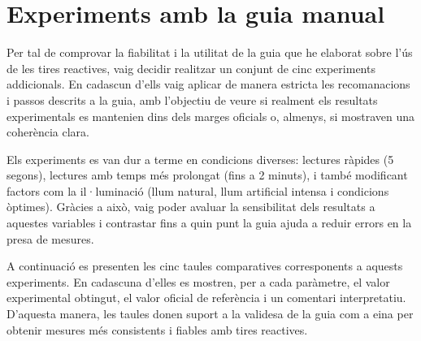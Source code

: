 
\chapter{Experiments amb la guia manual} \label{a:guia}

Per tal de comprovar la fiabilitat i la utilitat de la guia que he elaborat sobre l’ús de les tires reactives, vaig decidir realitzar un conjunt de cinc experiments addicionals. En cadascun d’ells vaig aplicar de manera estricta les recomanacions i passos descrits a la guia, amb l’objectiu de veure si realment els resultats experimentals es mantenien dins dels marges oficials o, almenys, si mostraven una coherència clara.

Els experiments es van dur a terme en condicions diverses: lectures ràpides (5 segons), lectures amb temps més prolongat (fins a 2 minuts), i també modificant factors com la il·luminació (llum natural, llum artificial intensa i condicions òptimes). Gràcies a això, vaig poder avaluar la sensibilitat dels resultats a aquestes variables i contrastar fins a quin punt la guia ajuda a reduir errors en la presa de mesures.

A continuació es presenten les cinc taules comparatives corresponents a aquests experiments. En cadascuna d’elles es mostren, per a cada paràmetre, el valor experimental obtingut, el valor oficial de referència i un comentari interpretatiu. D’aquesta manera, les taules donen suport a la validesa de la guia com a eina per obtenir mesures més consistents i fiables amb tires reactives.


